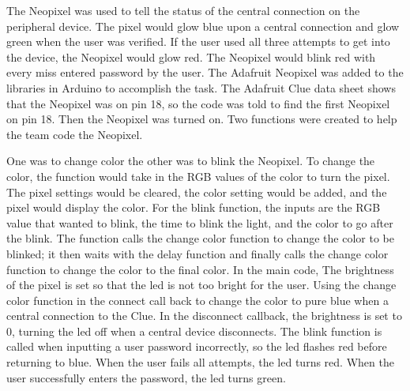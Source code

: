 \documentclass[12pt]{article}
\begin{document}
\hspace{1cm}The Neopixel was used to tell the status of the central connection on the peripheral device. The pixel would glow blue upon a central connection and glow green when the user was verified. If the user used all three attempts to get into the device, the Neopixel would glow red. The Neopixel would blink red with every miss entered password by the user. The Adafruit Neopixel was added to the libraries in Arduino to accomplish the task. The Adafruit Clue data sheet shows that the Neopixel was on pin 18, so the code was told to find the first Neopixel on pin 18. Then the Neopixel was turned on. Two functions were created to help the team code the Neopixel.

\hspace{1cm}One was to change color the other was to blink the Neopixel. To change the color, the function would take in the RGB values of the color to turn the pixel. The pixel settings would be cleared, the color setting would be added, and the pixel would display the color. For the blink function, the inputs are the RGB value that wanted to blink, the time to blink the light, and the color to go after the blink. The function calls the change color function to change the color to be blinked; it then waits with the delay function and finally calls the change color function to change the color to the final color. In the main code, The brightness of the pixel is set so that the led is not too bright for the user. Using the change color function in the connect call back to change the color to pure blue when a central connection to the Clue. In the disconnect callback, the brightness is set to 0, turning the led off when a central device disconnects. The blink function is called when inputting a user password incorrectly, so the led flashes red before returning to blue. When the user fails all attempts, the led turns red. When the user successfully enters the password, the led turns green.
\end{document}
